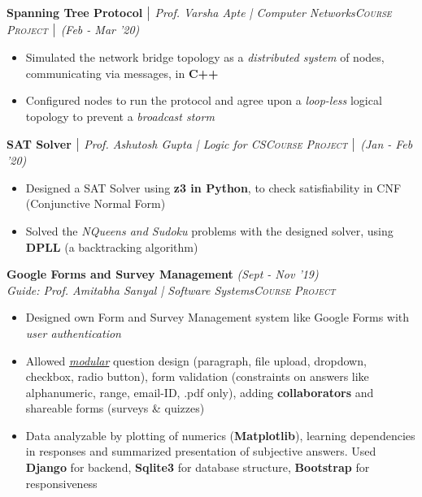 \documentclass{article}
\begin{document}
\vspace{-5pt}
\textbf{Spanning Tree Protocol} $\bigm|$ {\it Prof. Varsha Apte | Computer Networks}\hfill{\sl \small \textsc{Course Project} $\bigm|$ (Feb - Mar '20)}\\
\vspace{-19pt}
\begin{itemize}[itemsep = -1 mm, leftmargin=*]
   \item Simulated the network bridge topology as a \textit{distributed system} of nodes, communicating via messages, in \textbf{C++}
    \item Configured nodes to run the protocol and agree upon a \textit{loop-less} logical topology to prevent a \textit{broadcast storm}
\end{itemize}
\vspace{-5pt}
\textbf{SAT Solver} $\bigm|$ {\it Prof. Ashutosh Gupta | Logic for CS}\hfill{\sl \small \textsc{Course Project} $\bigm|$ (Jan - Feb '20)}\\
\vspace{-19pt}
\begin{itemize}[itemsep = -1 mm, leftmargin=*]
   \item Designed a SAT Solver using \textbf{z3 in Python}, to check satisfiability in CNF (Conjunctive Normal Form)
    \item Solved the \textit{NQueens and Sudoku} problems with the designed solver, using \textbf{DPLL} (a backtracking algorithm)
\end{itemize}
\vspace{-5pt}
\textbf{Google Forms and Survey Management} \hfill{\sl \small (Sept - Nov '19)}\\
{\it Guide: Prof. Amitabha Sanyal | Software Systems}\hfill{\sl \small \textsc{Course Project}}\\
\vspace{-19pt}
\begin{itemize}[itemsep = -1 mm, leftmargin=*]
    \item Designed own Form and Survey Management system like Google Forms with \textit{user authentication}
    \item Allowed \textit{\underline{modular}} question design (paragraph, file upload, dropdown, checkbox, radio button), form validation (constraints on answers like alphanumeric, range, email-ID, .pdf only), adding \textbf{collaborators} and shareable forms (surveys \& quizzes)
    \item Data analyzable by plotting of numerics (\textbf{Matplotlib}), learning dependencies in responses and summarized presentation of subjective answers. Used \textbf{Django} for backend, \textbf{Sqlite3} for database structure, \textbf{Bootstrap} for responsiveness
\end{itemize}
\end{document}
